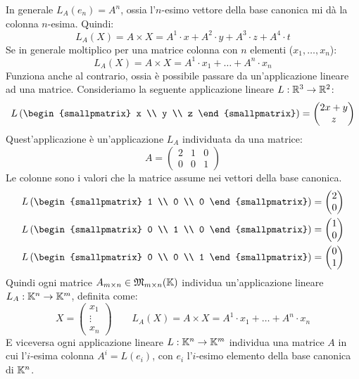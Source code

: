 In generale $L_A (e_n) = A^n$, ossia l'$n$-esimo vettore della base canonica mi d\`a la colonna $n$-esima. Quindi:
\[
L_A(X) = A \times X = A^1 \cdot x + A^2 \cdot y + A^3 \cdot z + A^4 \cdot t
\]
Se in generale moltiplico per una matrice colonna con $n$ elementi ($x_{1}, \ldots, x_{n}$):
\[
L_A(X) = A \times X = A^1 \cdot x_1 + \dots + A^n \cdot x_n
\]
Funziona anche al contrario, ossia \`e possibile passare da un'applicazione lineare ad una matrice. Consideriamo la seguente applicazione lineare $L : \mathbb{R}^3 \to \mathbb{R}^2$:
\[
L \left(
\begin{smallpmatrix}
x \\ y \\ z
\end{smallpmatrix}
\right) = 
\begin{pmatrix}
2x+y \\ z
\end{pmatrix}
\]
Quest'applicazione \`e un'applicazione $L_A$ individuata da una matrice:
\[
A = 
\begin{pmatrix}
2 & 1 & 0 \\
0 & 0 & 1
\end{pmatrix}
\]
Le colonne sono i valori che la matrice assume nei vettori della base canonica.
\begin{align*}
L \left(
\begin{smallpmatrix}
1 \\ 0 \\ 0
\end{smallpmatrix}
\right) = 
\begin{pmatrix}
2 \\ 0
\end{pmatrix} \\
L \left(
\begin{smallpmatrix}
0 \\ 1 \\ 0
\end{smallpmatrix}
\right) = 
\begin{pmatrix}
1 \\ 0
\end{pmatrix} \\
L \left(
\begin{smallpmatrix}
0 \\ 0 \\ 1
\end{smallpmatrix}
\right) = 
\begin{pmatrix}
0 \\ 1
\end{pmatrix}
\end{align*}
Quindi ogni matrice $A_{m \times n} \in \mathfrak{M}_{m \times n} (\mathbb{K})$ individua un'applicazione lineare $L_A : \mathbb{K}^n \to \mathbb{K}^m$, definita come:
\[
X = 
\begin{pmatrix}
x_1 \\ \vdots \\ x_n
\end{pmatrix}
\qquad
L_A (X) = A \times X = A^1 \cdot x_1 + \ldots + A^n \cdot x_n
\]
E viceversa ogni applicazione lineare $L : \mathbb{K}^n \to \mathbb{K}^m$ individua una matrice $A$ in cui l'$i$-esima colonna $A^i = L(e_i)$, con $e_i$ l'$i$-esimo elemento della base canonica di $\mathbb{K}^n$.

